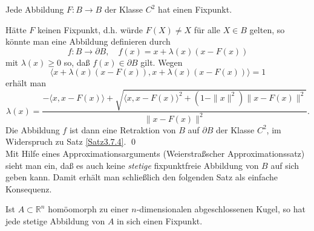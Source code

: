 \documentclass[a4paper,twoside,DIV15,BCOR12mm]{scrbook}
\begin{document}
\bigskip

\begin{satz}\label{Satz3.7.5} {Jede Abbildung $F: B \to B$ der 
Klasse $C^{2}$ hat einen Fixpunkt.}
\end{satz}

\bigskip

 Hätte $F$ keinen Fixpunkt, d.h. würde $F(X) \not= 
X$ für alle $X\in B$ gelten, so könnte man eine Abbildung definieren durch
\[ f: B \to \partial B, \quad f(x) = x + \lambda(x)(x - F(x)) \]
mit $\lambda(x) \ge 0$ so, daß $f(x) \in \partial B$ gilt. Wegen
\[ \langle x + \lambda(x)(x-F(x)), x + \lambda(x)(x - F(x)) \rangle = 
1 \]
erhält man
\[ \lambda(x) = \frac{-\langle x, x - F(x)\rangle + \sqrt{\langle x, 
x - F(x) \rangle^{2} + (1-\|x\|^{2}) \|x - F(x)\|^{2}}}{\|x - 
F(x)\|^{2}}. \]
Die Abbildung $f$ ist dann eine Retraktion von $B$ auf $\partial B$ 
der Klasse $C^{2}$, im  Widerspruch zu Satz \ref{Satz3.7.4}. \qed\\

\noindent
Mit Hilfe eines Approximationsarguments (Weierstraßscher Approximationssatz) 
sieht man ein, daß es auch 
keine {\em stetige} fixpunktfreie Abbildung von $B$ auf sich geben kann. 
Damit erhält man schließlich den folgenden Satz als einfache Konsequenz.

\bigskip

\begin{satz}\label{Satz3.7.6}  {Ist $A 
\subset {\mathbb R}^{n}$ homöomorph zu einer $n$-dimensionalen 
abgeschlossenen Kugel, so hat jede stetige Abbildung von $A$ in sich 
einen Fixpunkt.}
\end{satz}
\end{document}
